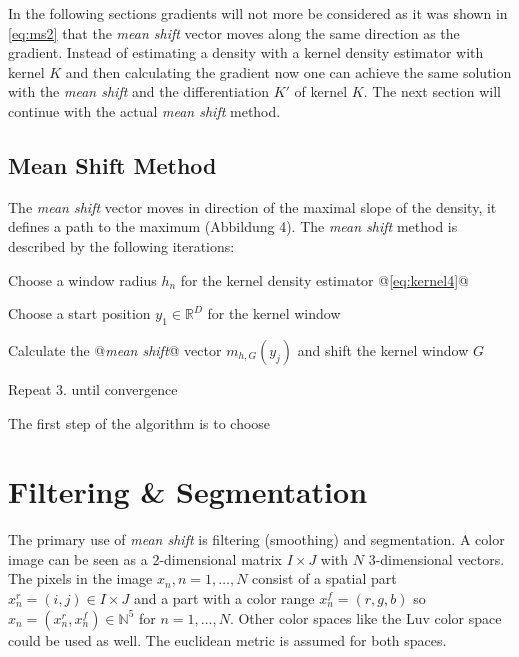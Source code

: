 In the following sections gradients will not more be considered as it was shown
in \autoref{eq:ms2} that the \emph{mean shift} vector moves along the same
direction as the gradient. Instead of estimating a density with a kernel 
density estimator with kernel $K$ and then calculating the gradient now one can
achieve the same solution with the \emph{mean shift} and the differentiation
$K'$ of kernel $K$. The next section will continue with the actual \emph{mean shift}
method.

\subsection{Mean Shift Method} 
\label{sec:mean_shift_method}

The \emph{mean shift} vector moves in direction of the maximal slope of the
density, it defines a path to the maximum (Abbildung 4). The \emph{mean shift}
method is described by the following iterations:

\begin{aenumerate}
  \label{enum:ms0}
	\item Choose a window radius $h_n$ for the kernel density estimator @\autoref{eq:kernel4}@
  	\item Choose a start position $y_1 \in \mathbb{R}^D$ for the kernel window
   	\item Calculate the @\emph{mean shift}@ vector $m_{h,G}(y_j)$ and shift the kernel window $G$
	\item Repeat 3. until convergence
\end{aenumerate}


The first step of the algorithm is to choose 



\section{Filtering {\upshape\&} Segmentation} %
\label{sec:filtering_segmentation}
The primary use of \emph{mean shift} is filtering (smoothing) and segmentation. 
A color image can be seen as a 2-dimensional matrix $I \times J$ with $N$ 
3-dimensional vectors. The pixels in the image $x_n, n = 1, \ldots , N$ consist of
a spatial part $x_n^r = (i,j) \in I \times J$ and a part with a color range
$x_n^f = (r,g,b)$ so $x_n = (x_n^r, x_n^f) \in \mathbb{N}^5$ for $n = 1, \ldots , N$.
Other color spaces like the \gls{Luv} color space could be used as well. The 
euclidean metric is assumed for both spaces. 

